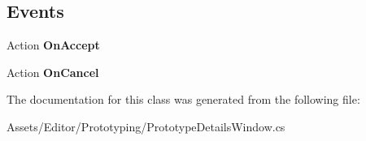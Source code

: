\subsection*{Events}
\begin{DoxyCompactItemize}
\item 
\hypertarget{class_hattori_game2_1_1_prototyping_1_1_prototype_details_window_ac4443ee82657edefe27a78f08b871a09}{}Action {\bfseries On\+Accept}\label{class_hattori_game2_1_1_prototyping_1_1_prototype_details_window_ac4443ee82657edefe27a78f08b871a09}

\item 
\hypertarget{class_hattori_game2_1_1_prototyping_1_1_prototype_details_window_abd7685ce673d74bb5e44e8c8b6c567a5}{}Action {\bfseries On\+Cancel}\label{class_hattori_game2_1_1_prototyping_1_1_prototype_details_window_abd7685ce673d74bb5e44e8c8b6c567a5}

\end{DoxyCompactItemize}


The documentation for this class was generated from the following file\+:\begin{DoxyCompactItemize}
\item 
Assets/\+Editor/\+Prototyping/Prototype\+Details\+Window.\+cs\end{DoxyCompactItemize}
